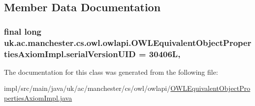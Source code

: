 \subsection{Member Data Documentation}
\hypertarget{classuk_1_1ac_1_1manchester_1_1cs_1_1owl_1_1owlapi_1_1_o_w_l_equivalent_object_properties_axiom_impl_a8ec60765ec6a628f686dec78e990f5c9}{
\subsubsection[{serial\-Version\-U\-I\-D}]{\setlength{\rightskip}{0pt plus 5cm}final long uk.\-ac.\-manchester.\-cs.\-owl.\-owlapi.\-O\-W\-L\-Equivalent\-Object\-Properties\-Axiom\-Impl.\-serial\-Version\-U\-I\-D = 30406\-L\hspace{0.3cm}{\ttfamily [static]}, {\ttfamily [private]}}}\label{classuk_1_1ac_1_1manchester_1_1cs_1_1owl_1_1owlapi_1_1_o_w_l_equivalent_object_properties_axiom_impl_a8ec60765ec6a628f686dec78e990f5c9}


The documentation for this class was generated from the following file\-:\begin{DoxyCompactItemize}
\item 
impl/src/main/java/uk/ac/manchester/cs/owl/owlapi/\hyperlink{_o_w_l_equivalent_object_properties_axiom_impl_8java}{O\-W\-L\-Equivalent\-Object\-Properties\-Axiom\-Impl.\-java}\end{DoxyCompactItemize}
